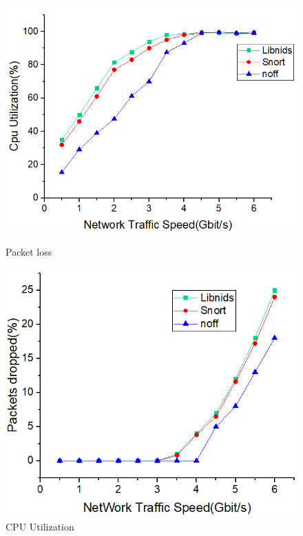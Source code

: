 \documentclass[conference]{IEEEtran}
\begin{document}
\begin{figure}
\begin{minipage}[t]{0.495\linewidth}
\flushleft
\includegraphics[width=\textwidth]{./picture/Figure6.jpg}
\caption{Packet loss} 
\label{fig:7}
\end{minipage}
\begin{minipage}[t]{0.495\linewidth}
\flushright
\includegraphics[width=\textwidth]{./picture/Figure7.jpg}
\caption{CPU Utilization}
\label{fig:8}
\end{minipage}
\end{figure} 
\end{document}
